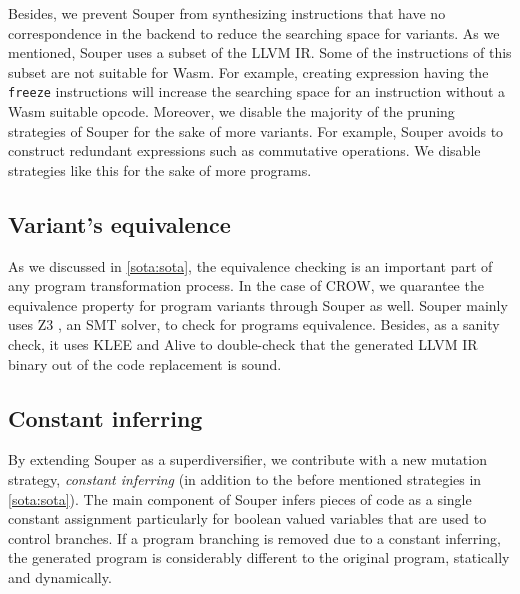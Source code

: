 Besides, we prevent Souper from synthesizing instructions that have no correspondence in the \wasm backend to reduce the searching space for variants. As we mentioned, Souper uses a subset of the LLVM IR. Some of the instructions of this subset are not suitable for Wasm. For example, creating expression having the  \texttt{freeze} instructions will increase the searching space for an instruction without a Wasm suitable opcode.
Moreover, we disable the majority of the pruning strategies of Souper for the sake of more variants. For example, Souper avoids to construct redundant expressions such as commutative operations. We disable strategies like this for the sake of more programs.  %

\subsection*{Variant's equivalence}

As we discussed in \autoref{sota:sota}, the equivalence checking is an important part of any program transformation process. In the case of CROW, we quarantee the equivalence property for program variants through Souper as well. Souper mainly uses Z3 \citationneeded, an SMT solver, to check for programs equivalence.  Besides, as a sanity check, it uses KLEE and Alive to double-check that the generated LLVM IR binary out of the code replacement is sound.

\todo{}


\subsection*{Constant inferring}

By extending Souper as a superdiversifier, we contribute with a new mutation strategy, \emph{constant inferring} (in addition to the before mentioned strategies in \autoref{sota:sota}).  
The main component of Souper infers pieces of code as a single constant assignment particularly for boolean valued variables that are used to control branches.
If a program branching is removed due to a constant inferring, the generated program is considerably different to the original program, statically and dynamically.


